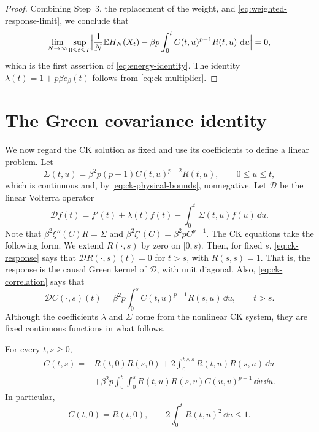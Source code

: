 \begin{proof}
Combining Step~3, the replacement of the weight, and \eqref{eq:weighted-response-limit}, we conclude that
\[
 \lim_{N\to\infty}\sup_{0\le t\le T}\Bigl|\frac1N\mathbb E H_N(X_t)-\beta p\int_0^tC(t,u)^{p-1}R(t,u)\,\mathop{}\!\mathrm d u\Bigr|=0,
\]
which is the first assertion of \eqref{eq:energy-identity}. The identity $\lambda(t)=1+p\beta e_\beta(t)$ follows from \eqref{eq:ck-multiplier}.
\end{proof}

\section{The Green covariance identity}\label{sec:green-covariance}

We now regard the CK solution as fixed and use its coefficients to define a linear problem. Let
\begin{equation}
\Sigma(t,u)=\beta^2p(p-1)C(t,u)^{p-2}R(t,u),\qquad 0\le u\le t,
\label{eq:self-energy-kernel}
\end{equation}
which is continuous and, by \eqref{eq:ck-physical-bounds}, nonnegative. Let $\mathcal D$ be the linear Volterra operator
\[
\mathcal D f(t)=f'(t)+\lambda(t)f(t)-\int_0^t\Sigma(t,u)f(u)\,\dd u.
\]
Note that $\beta^2\xi''(C)R=\Sigma$ and $\beta^2\xi'(C)=\beta^2pC^{p-1}$. The CK equations take the following form. We extend $R(\cdot,s)$ by zero on $[0,s)$. Then, for fixed $s$, \eqref{eq:ck-response} says that $\mathcal DR(\cdot,s)(t)=0$ for $t>s$, with $R(s,s)=1$. That is, the response is the causal Green kernel of $\mathcal D$, with unit diagonal. Also, \eqref{eq:ck-correlation} says that
\begin{equation}\label{eq:ck-correlation-linear}
 \mathcal DC(\cdot,s)(t)=\beta^2p\int_0^sC(t,u)^{p-1}R(s,u)\,\dd u,\qquad t>s.
\end{equation}
Although the coefficients $\lambda$ and $\Sigma$ come from the nonlinear CK system, they are fixed continuous functions in what follows.

\begin{proposition}\label{prop:green-covariance}
For every $t,s\ge0$,
\begin{align}
C(t,s)={}&R(t,0)R(s,0)
 +2\int_0^{t\wedge s}R(t,u)R(s,u)\,\dd u
 \nonumber\\
&+\beta^2p\int_0^t\int_0^s
       R(t,u)R(s,v)C(u,v)^{p-1}\,\dd v\,\dd u.
\label{eq:green-covariance}
\end{align}
In particular,
\begin{equation}
C(t,0)=R(t,0),\qquad
2\int_0^tR(t,u)^2\,\dd u\le1.
\label{eq:initial-response-row-bound}
\end{equation}
\end{proposition}

